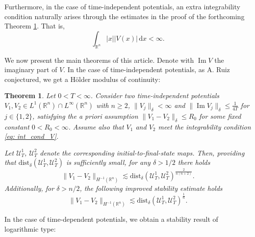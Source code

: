 \documentclass[10pt,a4paper]{amsart}
\newtheorem{theorem}[proposition]{Theorem}
\theoremstyle{remark}
\theoremstyle{definition}
\newcommand{\R}{\mathbb{R}}
\newcommand{\dd}{\mathrm{d}}
\newcommand{\dist}{\mathrm{dist}}
\def\Im{\mathop\mathrm{Im}}
\def\lec{\lesssim}
\def\cal{\mathcal}
\begin{document}
%
Furthermore, in the case of time-independent potentials, an extra integrability condition naturally arises through the estimates in the proof of the forthcoming Theorem \ref{th: stability_t_independent}. That is, 
%
\begin{equation}\label{eq: int_cond_V}
\int_{\R^n} |x| |V(x)| \, \dd x < \infty. 
\end{equation}
%



We now present the main theorems of this article. Denote with $\Im V$ the imaginary part of $V$. In the case of time-independent potentials, as A. Ruiz conjectured, we get a H\"older modulus of continuity: 
\begin{theorem}\label{th: stability_t_independent}
Let $0<T<\infty$. Consider two time-independent potentials $V_1, V_2 \in L^1(\R^n) \cap L^\infty(\R^n)$ with $n\geq 2$, $\| V_j \|_\delta< \infty$ and $\| \Im V_j \|_\delta \leq \frac{1}{4T}$ for $j\in\{1, 2\}$, satisfying the a priori assumption $\| V_1 - V_2\|_\delta \leq R_0$ for some fixed constant $0<R_0<\infty$. 
Assume also that $V_1$ and $V_2$ meet the integrability condition \eqref{eq: int_cond_V}.

Let $\cal{U}_T^1$, $\cal{U}_T^2$ denote the corresponding initial-to-final-state maps. Then, providing that $ \dist_{\delta} (\cal{U}_T^1, \cal{U}_T^2)$ is sufficiently small, for any $\delta>1/2$ there holds
% 
\begin{equation}\label{eq: stability1_est_t_independent}
\|V_1 - V_2\|_{H^{-1}(\R^n)} \lec \dist_{\delta} (\cal{U}_T^1, \cal{U}_T^2)^{\frac{2}{n(n+2)}}.
\end{equation}
%
Additionally, for $\delta>n/2$, the following improved stability estimate holds
%
\begin{equation}\label{eq: stability2_est_t_independent}
\|V_1 - V_2\|_{H^{-1}(\R^n)} \lec \dist_{\delta} (\cal{U}_T^1, \cal{U}_T^2)^{\frac{1}{n}}. 
\end{equation}
%
\end{theorem}


In the case of time-dependent potentials, we obtain a stability result of logarithmic type:
\end{document}
